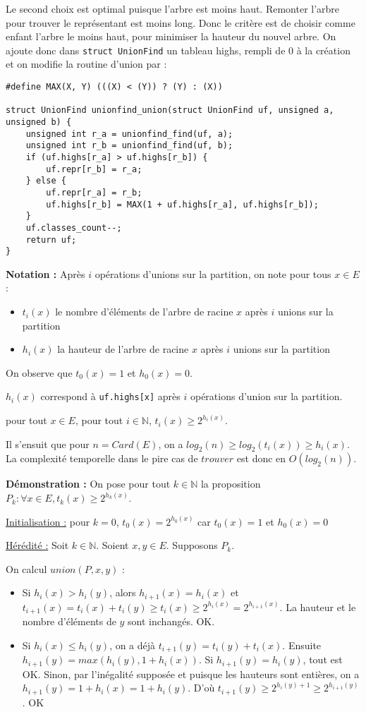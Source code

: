 \documentclass[../../../main.tex]{subfiles}
\begin{document}
Le second choix est optimal puisque l'arbre est moins haut. Remonter l'arbre pour trouver le représentant est moins long. Donc le critère est de choisir comme enfant l'arbre le moins haut, pour minimiser la hauteur du nouvel arbre. On ajoute donc dans \texttt{struct UnionFind} un tableau \textsf{highs}, rempli de $0$ à la création et on modifie la routine d'union par :
\begin{verbatim}
#define MAX(X, Y) (((X) < (Y)) ? (Y) : (X))

struct UnionFind unionfind_union(struct UnionFind uf, unsigned a, unsigned b) {
	unsigned int r_a = unionfind_find(uf, a);
	unsigned int r_b = unionfind_find(uf, b);
	if (uf.highs[r_a] > uf.highs[r_b]) {
		uf.repr[r_b] = r_a;
	} else {
		uf.repr[r_a] = r_b;
		uf.highs[r_b] = MAX(1 + uf.highs[r_a], uf.highs[r_b]);
	}
	uf.classes_count--;
	return uf;
}
\end{verbatim}
\textbf{Notation :} Après $i$ opérations d'unions sur la partition, on note pour tous $x\in E$ :
\begin{itemize}
	\item $t_i(x)$ le nombre d'éléments de l'arbre de racine $x$ après $i$ unions sur la partition
	\item $h_i(x)$ la hauteur de l'arbre de racine $x$ après $i$ unions sur la partition
\end{itemize}
On observe que $t_0(x) = 1$ et $h_0(x) = 0$.

$h_i(x)$ correspond à \texttt{uf.highs[x]} après $i$ opérations d'union sur la partition.

 pour tout $x\in E$, pour tout $i\in \mathbb{N}$, $t_i(x)\geq 2^{h_i(x)}$.

Il s'ensuit que pour $n = Card(E)$, on a $log_2(n) \geq log_2(t_i(x))\geq h_i(x)$. La complexité temporelle dans le pire cas de $trouver$ est donc en $O(log_2(n))$.

\textbf{Démonstration :} On pose pour tout $k\in\mathbb{N}$ la proposition $P_k : \forall x\in E, t_k(x)\geq 2^{h_k(x)}$.

\underline{Initialisation :} pour $k = 0$, $t_0(x) = 2^{h_0(x)}$ car $t_0(x) = 1$ et $h_0(x) = 0$

\underline{Hérédité :} Soit $k\in\mathbb{N}$. Soient $x, y\in E$. Supposons $P_k$.

On calcul $union(P, x, y)$ :
\begin{itemize}
	\item Si $h_i(x) > h_i(y)$, alors $h_{i+1}(x) = h_i(x)$ et $t_{i+1}(x) = t_i(x) + t_i(y) \geq t_i(x) \geq 2^{h_{i}(x)} = 2^{h_{i+1}(x)}$. La hauteur et le nombre d'éléments de $y$ sont inchangés. OK.
	\item Si $h_i(x) \leq h_i(y)$, on a déjà $t_{i+1}(y) = t_i(y) + t_i(x)$. Ensuite $h_{i+1}(y) = max(h_i(y), 1 + h_i(x))$. Si $h_{i+1}(y) = h_i(y)$, tout est OK. Sinon, par l'inégalité supposée et puisque les hauteurs sont entières, on a $h_{i+1}(y) = 1 + h_i(x) = 1 + h_i(y)$. D'où $t_{i+1}(y) \geq 2^{h_i(y) + 1}\geq 2^{h_{i+1}(y)}$ . OK
\end{itemize}
\end{document}
